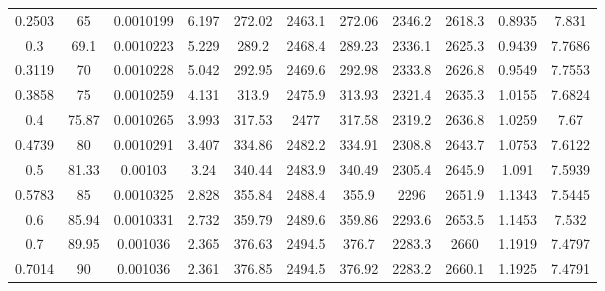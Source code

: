 \begin{longtable}{ccccccccccc}
0.2503   & 65          & 0.0010199              & 6.197               & 272.02                 & 2463.1              & 272.06          & 2346.2       & 2618.3       & 0.8935         & 7.831       \\
0.3      & 69.1        & 0.0010223              & 5.229               & 289.2                  & 2468.4              & 289.23          & 2336.1       & 2625.3       & 0.9439         & 7.7686      \\
0.3119   & 70          & 0.0010228              & 5.042               & 292.95                 & 2469.6              & 292.98          & 2333.8       & 2626.8       & 0.9549         & 7.7553      \\
0.3858   & 75          & 0.0010259              & 4.131               & 313.9                  & 2475.9              & 313.93          & 2321.4       & 2635.3       & 1.0155         & 7.6824      \\
0.4      & 75.87       & 0.0010265              & 3.993               & 317.53                 & 2477                & 317.58          & 2319.2       & 2636.8       & 1.0259         & 7.67        \\
0.4739   & 80          & 0.0010291              & 3.407               & 334.86                 & 2482.2              & 334.91          & 2308.8       & 2643.7       & 1.0753         & 7.6122      \\
0.5      & 81.33       & 0.00103                & 3.24                & 340.44                 & 2483.9              & 340.49          & 2305.4       & 2645.9       & 1.091          & 7.5939      \\
0.5783   & 85          & 0.0010325              & 2.828               & 355.84                 & 2488.4              & 355.9           & 2296         & 2651.9       & 1.1343         & 7.5445      \\
0.6      & 85.94       & 0.0010331              & 2.732               & 359.79                 & 2489.6              & 359.86          & 2293.6       & 2653.5       & 1.1453         & 7.532       \\
0.7      & 89.95       & 0.001036               & 2.365               & 376.63                 & 2494.5              & 376.7           & 2283.3       & 2660         & 1.1919         & 7.4797      \\
0.7014   & 90          & 0.001036               & 2.361               & 376.85                 & 2494.5              & 376.92          & 2283.2       & 2660.1       & 1.1925         & 7.4791      \\

\end{longtable}
